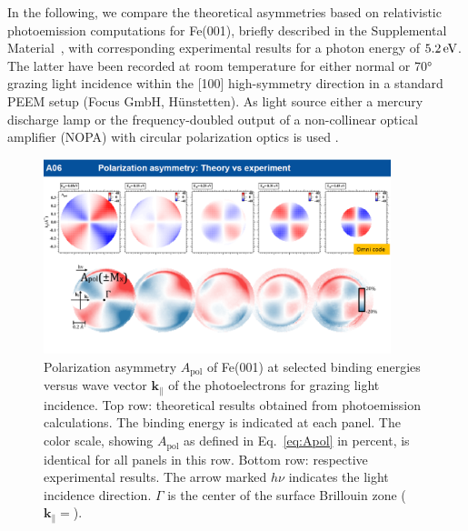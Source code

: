 \documentclass[prl,twocolumn,floatfix]{revtex4-2}
\renewcommand{\vec}[1]{\boldsymbol{#1}}
\begin{document}
In the following, we compare the theoretical asymmetries based on relativistic photoemission computations for Fe(001), briefly described in the Supplemental Material~\cite{Supplement}, with corresponding experimental results for a photon energy of $\unit[5.2]{eV}$. The latter have been recorded at room temperature for either normal or 70° grazing light incidence within the [100] high-symmetry direction in a standard PEEM setup (Focus GmbH, Hünstetten). As light source either a mercury discharge lamp or the frequency-doubled output of a non-collinear optical amplifier (NOPA) with circular polarization optics is used \cite{Duncker12,Gillmeister20,Paleschke21}. 

\begin{figure}
    \centering
    \includegraphics[width = 0.9\textwidth]{Apol}
    \caption{Polarization asymmetry $A_{\mathrm{pol}}$ of Fe(001) at selected binding energies versus wave vector $\vec{k}_{\parallel}$ of the photoelectrons for grazing light incidence. Top row: theoretical results obtained from photoemission calculations. The binding energy is indicated at each panel. The color scale, showing $A_{\mathrm{pol}}$ as defined in Eq.~\eqref{eq:Apol} in percent, is identical for all panels in this row. Bottom row: respective experimental results. The arrow marked $h \nu$ indicates the light incidence direction. $\Gamma$ is the center of the surface Brillouin zone ($\vec{k}_{\parallel} = $).}
    \label{fig:Apol}
\end{figure}
\end{document}
